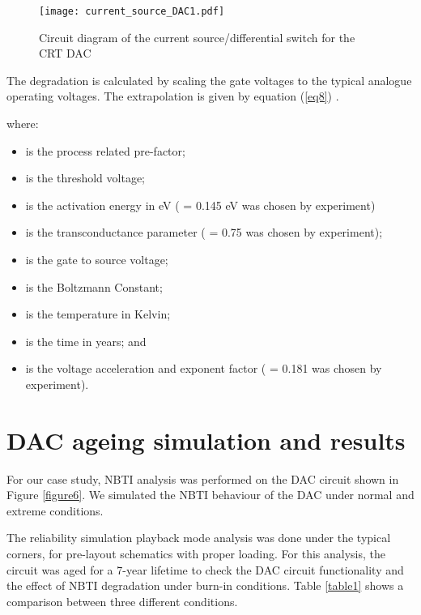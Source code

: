\documentclass[11pt,a4paper]{article}
\begin{document}
\begin{figure}[t]
\centering
\texttt{[image: current\_source\_DAC1.pdf]}
\caption{Circuit diagram of the current source/differential switch for the CRT DAC}
\label{figure8}
\end{figure}
The  degradation 
is calculated by scaling the gate voltages to the typical analogue operating voltages. The extrapolation is given by equation (\ref{eq8}) \cite{Jha}.

where:
\begin{itemize}\item  is the process related pre-factor;
\item  is the threshold voltage;
\item  is the activation energy in eV ( = 0.145 eV was chosen by experiment)
\item  is the transconductance parameter ( = 0.75 was chosen by experiment);
\item  is the gate to source voltage;
\item  is the Boltzmann Constant;
\item  is the temperature in Kelvin;
\item  is the time in years; and
\item  is the voltage acceleration and exponent factor ( = 0.181 was chosen by experiment).
\end{itemize}



\section{DAC ageing simulation and results}

For our case study, NBTI analysis was performed on the DAC circuit shown in Figure \ref{figure6}.  We simulated the NBTI behaviour of the DAC  under normal and extreme conditions. 

   
The reliability simulation playback mode analysis was done under the typical corners, for pre-layout schematics with proper loading. For this analysis, the circuit was aged for a 7-year lifetime to check the DAC circuit functionality and the effect of NBTI degradation under burn-in conditions. Table \ref{table1} shows a comparison between three different conditions.
\end{document}
